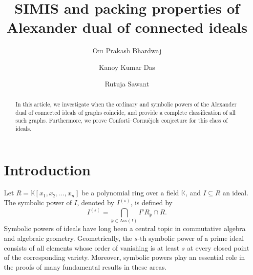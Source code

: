 \documentclass[12pt]{amsart}
\def\K{\mathbb{K}}
\begin{document}
\title{SIMIS and packing properties of Alexander dual of connected ideals}


 \author{Om Prakash Bhardwaj}
 \address{Chennai Mathematical Institute, Siruseri, Tamil Nadu, India}

 \author{Kanoy Kumar Das}
\address{Chennai Mathematical Institute, Siruseri, Tamil Nadu, India}

 \author{Rutuja Sawant}
\address{Chennai Mathematical Institute, Siruseri, Tamil Nadu, India}



\vspace*{-0.4cm}
\begin{abstract}
    In this article, we investigate when the ordinary and symbolic powers of the Alexander dual of connected ideals of graphs coincide, and provide a complete classification of all such graphs.  Furthermore, we prove Conforti--Cornu\`ejols conjecture for this class of~ ideals.
\end{abstract}

\maketitle

\section{Introduction}





Let $R=\K[x_1,x_2, \dots , x_n]$ be a polynomial ring over a field $\K$, and $I\subseteq R$ an ideal. The symbolic power of $I$, denoted by $I^{(s)}$, is defined by 
\[
I^{(s)} = \bigcap_{\mathfrak{p} \in \mathrm{Ass}(I)} I^s R_{\mathfrak{p}} \cap R.
\]
Symbolic powers of ideals have long been a central topic in commutative algebra and algebraic geometry. Geometrically, the $s$-th symbolic power of a prime ideal consists of all elements whose order of vanishing is at least $s$ at every closed point of the corresponding variety. Moreover, symbolic powers play an essential role in the proofs of many fundamental results in these areas.
\end{document}
